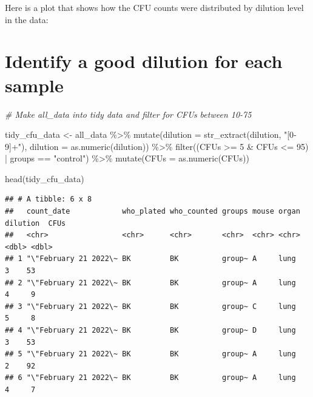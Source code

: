\documentclass[
]{book}
\newenvironment{Shaded}{\begin{snugshade}}{\end{snugshade}}
\newcommand{\AttributeTok}[1]{\textcolor[rgb]{0.77,0.63,0.00}{#1}}
\newcommand{\CommentTok}[1]{\textcolor[rgb]{0.56,0.35,0.01}{\textit{#1}}}
\newcommand{\DecValTok}[1]{\textcolor[rgb]{0.00,0.00,0.81}{#1}}
\newcommand{\FunctionTok}[1]{\textcolor[rgb]{0.00,0.00,0.00}{#1}}
\newcommand{\NormalTok}[1]{#1}
\newcommand{\OtherTok}[1]{\textcolor[rgb]{0.56,0.35,0.01}{#1}}
\newcommand{\SpecialCharTok}[1]{\textcolor[rgb]{0.00,0.00,0.00}{#1}}
\newcommand{\StringTok}[1]{\textcolor[rgb]{0.31,0.60,0.02}{#1}}
\begin{document}
Here is a plot that shows how the CFU counts were distributed by dilution
level in the data:

\hypertarget{identify-a-good-dilution-for-each-sample}{%
\section{Identify a good dilution for each sample}\label{identify-a-good-dilution-for-each-sample}}

\begin{Shaded}
\begin{Highlighting}[]
\CommentTok{\# Make all\_data into tidy data and filter for CFUs between 10{-}75}
  
\NormalTok{tidy\_cfu\_data }\OtherTok{\textless{}{-}}\NormalTok{ all\_data }\SpecialCharTok{\%\textgreater{}\%}
  \FunctionTok{mutate}\NormalTok{(}\AttributeTok{dilution =} \FunctionTok{str\_extract}\NormalTok{(dilution, }\StringTok{"[0{-}9]+"}\NormalTok{),}
         \AttributeTok{dilution =} \FunctionTok{as.numeric}\NormalTok{(dilution)) }\SpecialCharTok{\%\textgreater{}\%}
  \FunctionTok{filter}\NormalTok{((CFUs }\SpecialCharTok{\textgreater{}=} \DecValTok{5} \SpecialCharTok{\&}\NormalTok{ CFUs }\SpecialCharTok{\textless{}=} \DecValTok{95}\NormalTok{) }\SpecialCharTok{|}\NormalTok{ groups }\SpecialCharTok{==} \StringTok{"control"}\NormalTok{) }\SpecialCharTok{\%\textgreater{}\%}
  \FunctionTok{mutate}\NormalTok{(}\AttributeTok{CFUs =} \FunctionTok{as.numeric}\NormalTok{(CFUs)) }


\FunctionTok{head}\NormalTok{(tidy\_cfu\_data)}
\end{Highlighting}
\end{Shaded}

\begin{verbatim}
## # A tibble: 6 x 8
##   count_date            who_plated who_counted groups mouse organ dilution  CFUs
##   <chr>                 <chr>      <chr>       <chr>  <chr> <chr>    <dbl> <dbl>
## 1 "\"February 21 2022\~ BK         BK          group~ A     lung         3    53
## 2 "\"February 21 2022\~ BK         BK          group~ A     lung         4     9
## 3 "\"February 21 2022\~ BK         BK          group~ C     lung         5     8
## 4 "\"February 21 2022\~ BK         BK          group~ D     lung         3    53
## 5 "\"February 21 2022\~ BK         BK          group~ A     lung         2    92
## 6 "\"February 21 2022\~ BK         BK          group~ A     lung         4     7
\end{verbatim}
\end{document}
